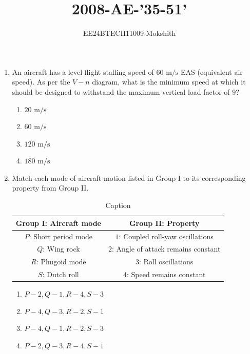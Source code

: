 \documentclass[journal]{IEEEtran}
\begin{document}

\title{2008-AE-'35-51'}
\author{EE24BTECH11009-Mokshith}
{\let\newpage\relax\maketitle}
\renewcommand{\thefigure}{\theenumi}
\renewcommand{\thetable}{\theenumi}
\setlength{\intextsep}{10pt} %
\renewcommand{\thetable}{\theenumi}

\begin{enumerate}[start=35]
\item An aircraft has a level flight stalling speed of $60 \text{ m/s}$ EAS (equivalent air speed). As per the $V-n$ diagram, what is the minimum speed at which it should be designed to withstand the maximum vertical load factor of $9$?
\begin{enumerate}
    \item $20 \text{ m/s}$
    \item $60 \text{ m/s}$
    \item $120 \text{ m/s}$
    \item $180 \text{ m/s}$
\end{enumerate}
\item Match each mode of aircraft motion listed in Group I to its corresponding property from Group II.
\begin{table}[h]
    \centering
    \begin{tabular}{|c|c|}
    \hline
      Group I: Aircraft mode & Group II: Property\\
      \hline
        $P$: Short period mode& $1$: Coupled roll-yaw oscillations\\
        \hline
        $Q$: Wing rock & $2$: Angle of attack remains constant\\
        \hline
        $R$: Phugoid mode & $3$: Roll oscillations\\
        \hline
        $S$: Dutch roll& $4$: Speed remains constant\\
        \hline
    \end{tabular}
    \caption{Caption}
\label{tab:my_label}
\end{table}
\begin{enumerate}
    \item $P-2, Q-1, R-4, S-3$
    \item $P-4, Q-3, R-2, S-1$
    \item $P-4, Q-1, R-2, S-3$
    \item $P-2, Q-3, R-4, S-1$

\end{enumerate}
\end{enumerate}
\end{document}
